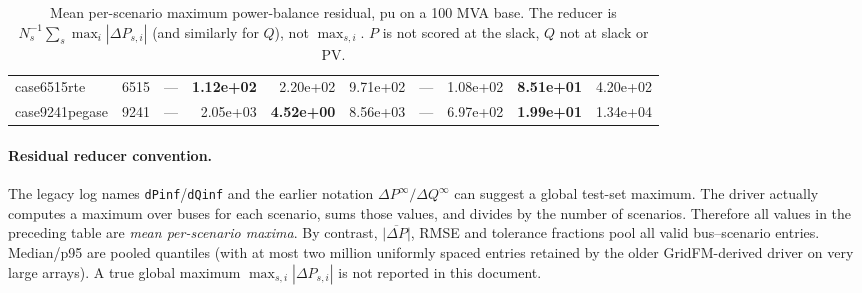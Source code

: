 \documentclass[10pt]{article}
\begin{document}
\begin{table}[H]
\begin{tabular}{lr rrrr rrrr}
case6515rte & 6515 & --- & \textbf{1.12e+02} & 2.20e+02 & 9.71e+02 & --- & 1.08e+02 & \textbf{8.51e+01} & 4.20e+02 \\
case9241pegase & 9241 & --- & 2.05e+03 & \textbf{4.52e+00} & 8.56e+03 & --- & 6.97e+02 & \textbf{1.99e+01} & 1.34e+04 \\
\bottomrule
\end{tabular}
\caption{Mean per-scenario maximum power-balance residual, pu on a 100 MVA
base.  The reducer is $N_s^{-1}\sum_s\max_i|\Delta P_{s,i}|$ (and similarly
for $Q$), not $\max_{s,i}$.  $P$ is not scored at the slack, $Q$ not at slack
or PV.}
\end{table}

\paragraph{Residual reducer convention.}
The legacy log names \texttt{dPinf}/\texttt{dQinf} and the earlier notation
$\Delta P^\infty/\Delta Q^\infty$ can suggest a global test-set maximum.  The
driver actually computes a maximum over buses for each scenario, sums those
values, and divides by the number of scenarios.  Therefore all values in the
preceding table are \emph{mean per-scenario maxima}.  By contrast,
$\overline{|\Delta P|}$, RMSE and tolerance fractions pool all valid
bus--scenario entries.  Median/p95 are pooled quantiles (with at most two
million uniformly spaced entries retained by the older GridFM-derived driver
on very large arrays).  A true global maximum $\max_{s,i}|\Delta P_{s,i}|$ is
not reported in this document.
\end{document}

